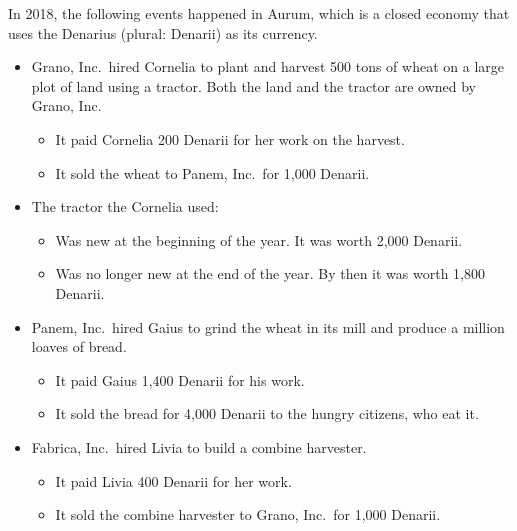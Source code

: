 \noindent In 2018, the following events happened in Aurum, which is a closed economy that uses the Denarius (plural: Denarii) as its currency.
\begin{itemize}[leftmargin=2.2em,topsep=2pt,itemsep=1pt]
\item Grano, Inc.\ hired Cornelia to plant and harvest 500 tons of wheat on a large plot of land using a tractor. Both the land and
the tractor are owned by Grano, Inc.
  \begin{itemize}[label=--,topsep=0pt,itemsep=0pt]
  \item It paid Cornelia 200 Denarii for her work on the harvest.
  \item It sold the wheat to Panem, Inc.\ for 1,000 Denarii.
  \end{itemize}
\item The tractor the Cornelia used:
  \begin{itemize}[label=--,topsep=0pt,itemsep=0pt]
  \item Was new at the beginning of the year. It was worth 2,000 Denarii.
  \item Was no longer new at the end of the year. By then it was worth 1,800 Denarii.
  \end{itemize}
\item Panem, Inc.\ hired Gaius to grind the wheat in its mill and produce a million loaves of bread.
  \begin{itemize}[label=--,topsep=0pt,itemsep=0pt]
  \item It paid Gaius 1,400 Denarii for his work.
  \item It sold the bread for 4,000 Denarii to the hungry citizens, who eat it.
  \end{itemize}
\item Fabrica, Inc.\ hired Livia to build a combine harvester.
  \begin{itemize}[label=--,topsep=0pt,itemsep=0pt]
  \item It paid Livia 400 Denarii for her work.
  \item It sold the combine harvester to Grano, Inc.\ for 1,000 Denarii.
  \end{itemize}
\end{itemize}
